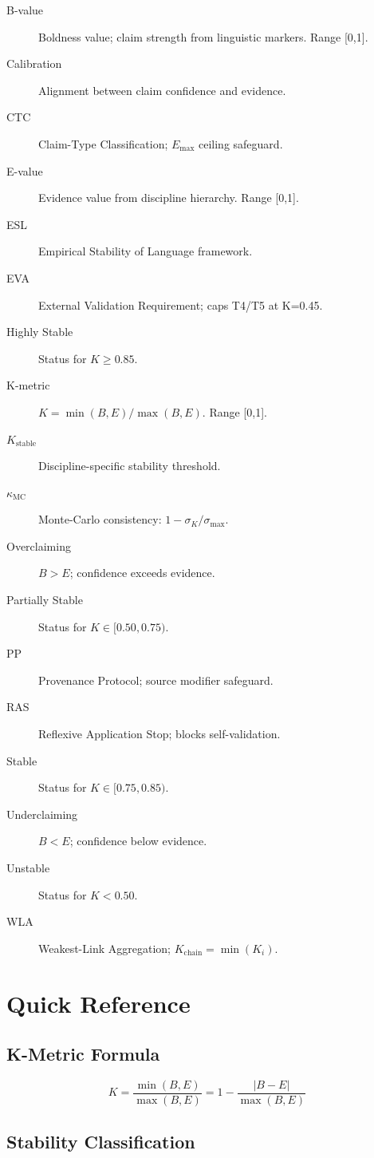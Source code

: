 \documentclass[11pt,a4paper]{article}
\begin{document}
\begin{description}
\item[B-value] Boldness value; claim strength from linguistic markers. Range [0,1].
\item[Calibration] Alignment between claim confidence and evidence.
\item[CTC] Claim-Type Classification; $E_{\max}$ ceiling safeguard.
\item[E-value] Evidence value from discipline hierarchy. Range [0,1].
\item[ESL] Empirical Stability of Language framework.
\item[EVA] External Validation Requirement; caps T4/T5 at K=0.45.
\item[Highly Stable] Status for $K \geq 0.85$.
\item[K-metric] $K = \min(B,E)/\max(B,E)$. Range [0,1].
\item[$K_{\text{stable}}$] Discipline-specific stability threshold.
\item[$\kappa_{\text{MC}}$] Monte-Carlo consistency: $1 - \sigma_K/\sigma_{\max}$.
\item[Overclaiming] $B > E$; confidence exceeds evidence.
\item[Partially Stable] Status for $K \in [0.50, 0.75)$.
\item[PP] Provenance Protocol; source modifier safeguard.
\item[RAS] Reflexive Application Stop; blocks self-validation.
\item[Stable] Status for $K \in [0.75, 0.85)$.
\item[Underclaiming] $B < E$; confidence below evidence.
\item[Unstable] Status for $K < 0.50$.
\item[WLA] Weakest-Link Aggregation; $K_{\text{chain}} = \min(K_i)$.
\end{description}

\newpage
\section{Quick Reference}

\subsection{K-Metric Formula}
$$K = \frac{\min(B, E)}{\max(B, E)} = 1 - \frac{|B - E|}{\max(B, E)}$$

\subsection{Stability Classification}
\end{document}
